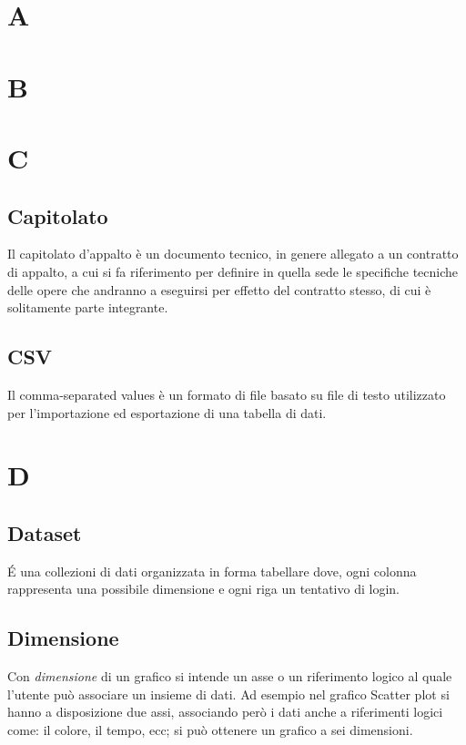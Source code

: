 \section{A}

\newpage
\section{B}

\newpage
\section{C}
\subsection{Capitolato}
Il capitolato d'appalto è un documento tecnico, in genere allegato a un contratto di appalto, a cui si fa riferimento per definire in quella sede le specifiche tecniche delle opere che andranno a eseguirsi per effetto del contratto stesso, di cui è solitamente parte integrante.

\subsection{CSV}
Il comma-separated values è un formato di file basato su file di testo utilizzato per l'importazione ed esportazione di una tabella di dati.

\newpage
\section{D}
\subsection{Dataset}
\'E una collezioni di dati organizzata in forma tabellare dove, ogni colonna rappresenta una possibile dimensione e ogni riga un tentativo di login.

\subsection{Dimensione}
Con \textit{dimensione} di un grafico si intende un asse o un riferimento logico al quale l'utente può associare un insieme di dati. Ad esempio nel grafico Scatter plot si hanno a disposizione due assi, associando però i dati anche a riferimenti logici come: il colore, il tempo, ecc; si può ottenere un grafico a sei dimensioni. 

